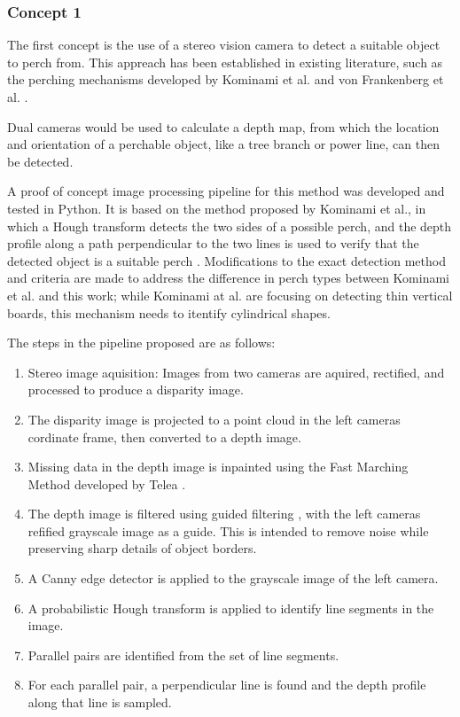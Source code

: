 \subsubsection{Concept 1}

The first concept is the use of a stereo vision camera to detect a suitable object to perch from.
This appreach has been established in existing literature, such as the perching mechanisms developed by
Kominami et al. \cite{kominami_detection_2023} and von Frankenberg et al. \cite{von_frankenberg_detection_2020}.

Dual cameras would be used to calculate a depth map, from which the location and orientation of a perchable object, like 
a tree branch or power line, can then be detected. 

A proof of concept image processing pipeline for this method was developed and tested in Python.
It is based on the method proposed by Kominami et al., in which a Hough transform detects the two
sides of a possible perch, and the depth profile along a path perpendicular to the two lines is 
used to verify that the detected object is a suitable perch \cite{kominami_detection_2023}.
Modifications to the exact detection method and criteria are made to address the difference 
in perch types between Kominami et al. and this work; while Kominami at al. are focusing 
on detecting thin vertical boards, this mechanism needs to itentify cylindrical shapes.

The steps in the pipeline proposed are as follows:

\begin{enumerate}
    \item Stereo image aquisition:
        Images from two cameras are aquired, rectified, and processed to produce a disparity image.
    \item The disparity image is projected to a point cloud in the left cameras cordinate frame,
        then converted to a depth image.
    \item Missing data in the depth image is inpainted using the Fast Marching Method developed by
        Telea \cite{telea_image_2004}.
    \item The depth image is filtered using guided filtering \cite{he_guided_2013}, 
        with the left cameras refified grayscale image as a guide. This is intended to
        remove noise while preserving sharp details of object borders.
    \item A Canny edge detector is applied to the grayscale image of the left camera.
    \item A probabilistic Hough transform is applied to identify line segments in the image.
    \item Parallel pairs are identified from the set of line segments.
    \item For each parallel pair, a perpendicular line is found and the depth profile along 
        that line is sampled.
\end{enumerate}


